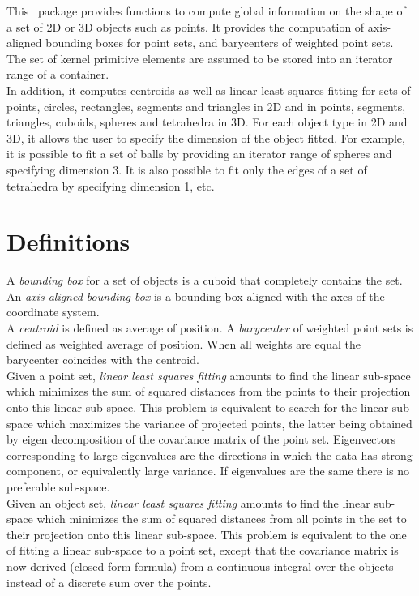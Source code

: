 This \cgal\ package provides functions to compute global information on the shape of a set of 2D or 3D objects such as points. It provides the computation of axis-aligned bounding boxes for point sets, and barycenters of weighted point sets. The set of kernel primitive elements are assumed to be stored into an iterator range of a container.\\

In addition, it computes centroids as well as linear least squares fitting for sets of points, circles, rectangles, segments and triangles in 2D and in points, segments, triangles, cuboids, spheres and tetrahedra in 3D. For each object type in 2D and 3D, it allows the user to specify the dimension of the object fitted. For example, it is possible to fit a set of balls by providing an iterator range of spheres and specifying dimension 3. It is also possible to fit only the edges of a set of tetrahedra by specifying dimension 1, etc.
\section{Definitions}

A \emph{bounding box} for a set of objects is a cuboid that completely contains the set. An \emph{axis-aligned bounding box} is a bounding box aligned with the axes of the coordinate system.\\

A \emph{centroid} is defined as average of position. A \emph{barycenter} of weighted point sets is defined as weighted
average of position. When all weights are equal the barycenter coincides with the centroid.\\

Given a point set, \emph{linear least squares fitting} amounts to find the linear sub-space which minimizes the sum of squared distances from the points to their projection onto this linear sub-space. This problem is equivalent to search for the linear sub-space which maximizes the variance of projected points, the latter being obtained by eigen decomposition of the covariance matrix of the point set. Eigenvectors corresponding to large eigenvalues are the
directions in which the data has strong component, or equivalently large variance. If eigenvalues are the same there is no preferable sub-space.\\

Given an object set, \emph{linear least squares fitting} amounts to find the linear sub-space which minimizes the sum of squared distances from all points in the set to their projection onto this linear sub-space. This problem is equivalent to the one of fitting a linear sub-space to a point set, except that the covariance matrix is now derived (closed form formula) from a continuous integral over the objects instead of a discrete sum over the points.


